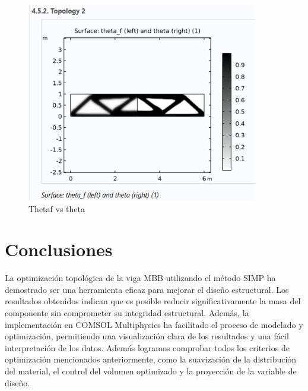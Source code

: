 \documentclass{article}
\theoremstyle{mytheoremstyle}
\theoremstyle{mytheoremstyle}
\theoremstyle{myproblemstyle}
\begin{document}
            \begin{figure}[H]
              \centering
              \includegraphics[width=0.9\textwidth]{theta.png}
              \caption{Thetaf vs theta} 
              \label{fig:resultados_thetaf_vs_theta}
            \end{figure}
          \section{Conclusiones}
La optimización topológica de la viga MBB utilizando el método SIMP ha demostrado ser una herramienta eficaz para mejorar el diseño estructural. Los resultados obtenidos indican que es posible reducir significativamente la masa del componente sin comprometer su integridad estructural. Además, la implementación en COMSOL Multiphysics ha facilitado el proceso de modelado y optimización, permitiendo una visualización clara de los resultados y una fácil interpretación de los datos. 
Además logramos comprobar todos los criterios de optimización mencionados anteriormente, como la suavización de la distribución del material, el control del volumen optimizado y la proyección de la variable de diseño. 


\nocite{*}

\end{document}
